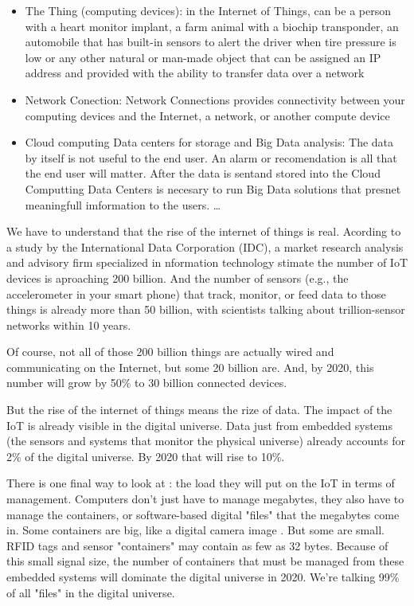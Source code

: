 \begin{itemize}
\item The Thing (computing devices):  in the Internet 
of Things, can be a person with a heart monitor implant, a farm animal with a 
biochip transponder, an automobile that has built-in sensors to alert the driver 
when tire pressure is low or any other natural or man-made object that can be 
assigned an IP address and provided with the ability to transfer data over a 
network
\item Network Conection: Network Connections provides connectivity between your 
computing devices  and the Internet, a network, or another compute device 

\item Cloud computing Data centers for storage and Big Data analysis: The data 
by itself is not useful to the end user. An alarm or recomendation is all that 
the end user will matter. After the data is sentand stored into the Cloud 
Computting Data Centers is necesary to run Big Data solutions that presnet 
meaningfull imformation to the users. \ldots
\end{itemize}

We have to understand that the rise of the internet of things is real. Acording 
to a study by the International Data Corporation (IDC), a market research 
analysis and advisory firm specialized in nformation technology stimate the 
number of IoT devices is aproaching  200 billion. And the number of sensors 
(e.g., the accelerometer in your smart phone) that track, monitor, or feed data 
to those things is already more than 50 billion, with scientists talking about 
trillion-sensor networks within 10 years.

Of course, not all of those 200 billion things are actually wired and 
communicating on the Internet, but some 20 billion are. And, by 2020, this 
number will grow by 50\% to 30 billion connected devices.

But the rise of the internet of things means the rize of data. The impact of the 
IoT is already visible in the digital universe. Data just from embedded systems 
(the sensors and systems that monitor the physical universe) already accounts 
for 2\% of the digital universe. By 2020 that will rise to 10\%.

There is one final way to look at : the load they will put on the IoT in terms 
of management. Computers don't just have to manage megabytes, they also have 
to manage the containers, or software-based digital "files" that the megabytes 
come in. Some containers are big, like a digital camera image . But some are 
small. RFID tags and sensor "containers" may contain as few as 32 bytes. Because 
of this small signal size, the number of containers that must be managed from 
these embedded systems will dominate the digital universe in 2020. We’re 
talking 99\% of all "files" in the digital universe.

